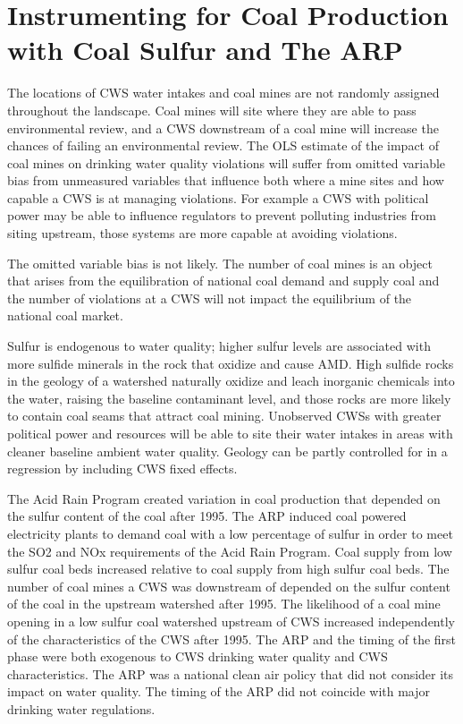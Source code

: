 \documentclass{article}
\begin{document}
\section{Instrumenting for Coal Production with Coal Sulfur and The ARP}

The locations of CWS water intakes and coal mines are not randomly assigned throughout the landscape. Coal mines will site where they are able to pass environmental review, and a CWS downstream of a coal mine will increase the chances of failing an environmental review. The OLS estimate of the impact of coal mines on drinking water quality violations will suffer from omitted variable bias from unmeasured variables that influence both where a mine sites and how capable a CWS is at managing violations. For example a CWS with political power may be able to influence regulators to prevent polluting industries from siting upstream, those systems are more capable at avoiding violations.

The omitted variable bias is not likely. The number of coal mines is an object that arises from the equilibration of national coal demand and supply coal and the number of violations at a CWS will not impact the equilibrium of the national coal market.

Sulfur is endogenous to water quality; higher sulfur levels are associated with more sulfide minerals in the rock that oxidize and cause AMD. High sulfide rocks in the geology of a watershed naturally oxidize and leach inorganic chemicals into the water, raising the baseline contaminant level, and those rocks are more likely to contain coal seams that attract coal mining. Unobserved CWSs with greater political power and resources will be able to site their water intakes in areas with cleaner baseline ambient water quality. Geology can be partly controlled for in a regression by including CWS fixed effects.

The Acid Rain Program created variation in coal production that depended on the sulfur content of the coal after 1995. The ARP induced coal powered electricity plants to demand coal with a low percentage of sulfur in order to meet the SO2 and NOx requirements of the Acid Rain Program. Coal supply from low sulfur coal beds increased relative to coal supply from high sulfur coal beds. The number of coal mines a CWS was downstream of depended on the sulfur content of the coal in the upstream watershed after 1995. The likelihood of a coal mine opening in a low sulfur coal watershed upstream of CWS increased independently of the characteristics of the CWS after 1995. The ARP and the timing of the first phase were both exogenous to CWS drinking water quality and CWS characteristics. The ARP was a national clean air policy that did not consider its impact on water quality. The timing of the ARP did not coincide with major drinking water regulations. 
\end{document}
